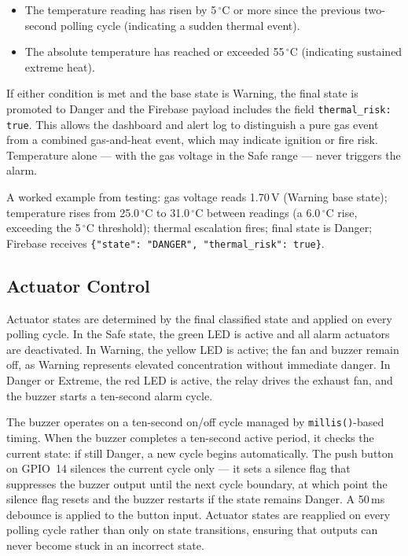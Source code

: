 \documentclass[a4paper,10pt,conference,onecolumn]{IEEEtran}
\begin{document}
\begin{itemize}
  \item The temperature reading has risen by 5\,$^{\circ}$C or more since
        the previous two-second polling cycle (indicating a sudden thermal
        event).
  \item The absolute temperature has reached or exceeded 55\,$^{\circ}$C
        (indicating sustained extreme heat).
\end{itemize}

If either condition is met and the base state is Warning, the final state is
promoted to Danger and the Firebase payload includes the field
\texttt{thermal\_risk: true}. This allows the dashboard and alert log to
distinguish a pure gas event from a combined gas-and-heat event, which may
indicate ignition or fire risk. Temperature alone --- with the gas voltage in
the Safe range --- never triggers the alarm.

A worked example from testing: gas voltage reads 1.70\,V (Warning base
state); temperature rises from 25.0\,$^{\circ}$C to 31.0\,$^{\circ}$C
between readings (a 6.0\,$^{\circ}$C rise, exceeding the 5\,$^{\circ}$C
threshold); thermal escalation fires; final state is Danger; Firebase
receives \texttt{\{"state": "DANGER", "thermal\_risk": true\}}.

\subsection{Actuator Control}

Actuator states are determined by the final classified state and applied on
every polling cycle. In the Safe state, the green LED is active and all
alarm actuators are deactivated. In Warning, the yellow LED is active; the
fan and buzzer remain off, as Warning represents elevated concentration
without immediate danger. In Danger or Extreme, the red LED is active, the
relay drives the exhaust fan, and the buzzer starts a ten-second alarm cycle.

The buzzer operates on a ten-second on/off cycle managed by
\texttt{millis()}-based timing. When the buzzer completes a ten-second active
period, it checks the current state: if still Danger, a new cycle begins
automatically. The push button on GPIO~14 silences the current cycle only ---
it sets a silence flag that suppresses the buzzer output until the next cycle
boundary, at which point the silence flag resets and the buzzer restarts if
the state remains Danger. A 50\,ms debounce is applied to the button input.
Actuator states are reapplied on every polling cycle rather than only on
state transitions, ensuring that outputs can never become stuck in an
incorrect state.
\end{document}

